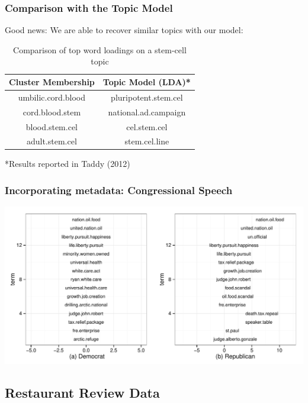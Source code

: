 \documentclass{beamer}
\begin{document}
\begin{frame}
\frametitle{Comparison with the Topic Model}
Good news: We are able to recover similar topics with our model:
\begin{table}[!htbp]
\caption{Comparison of top word loadings on a stem-cell topic} \label{tab:title}
\centering
\begin{tabular}{  c  c }
Cluster Membership & Topic Model (LDA)* \\
\hline
umbilic.cord.blood & pluripotent.stem.cel \\
cord.blood.stem  & national.ad.campaign \\
blood.stem.cel   & cel.stem.cel \\
adult.stem.cel & stem.cel.line \\
\end{tabular}
\end{table}
*Results reported in Taddy (2012)
\end{frame}

\begin{frame}
\frametitle{Incorporating metadata: Congressional Speech} %
\begin{center}
\includegraphics[width=1.1\textwidth]{Images/Blei_Changing_Loadings_GOP.pdf}
\end{center}
\end{frame}

\subsection{Restaurant Review Data}
\end{document}
